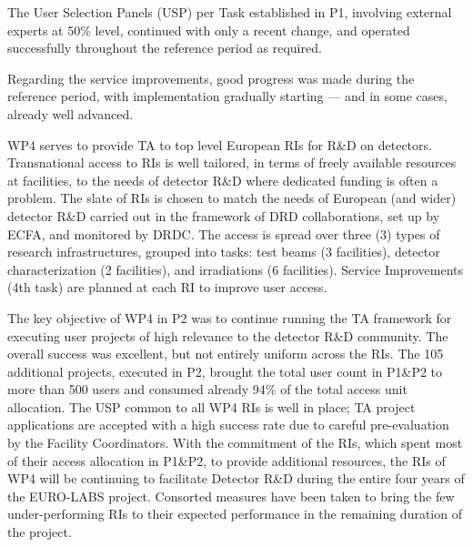 The User Selection Panels (USP) per Task established in P1, involving external experts at 50\% level,  continued with only a recent change, and operated successfully throughout the reference period as required. 

Regarding the service improvements, good progress was made during the reference period, with implementation gradually starting — and in some cases, already well advanced.



WP4 serves to provide TA to top level European RIs for R\&D on detectors. Transnational access to RIs is well tailored, in terms of freely available resources at facilities, to the needs of detector R\&D where dedicated funding is often a problem. The slate of RIs is chosen to match the needs of European (and wider) detector R\&D carried out in the framework of DRD collaborations, set up by ECFA, and monitored by DRDC. The access is spread over three (3) types of research infrastructures, grouped into tasks: test beams (3 facilities), detector characterization (2 facilities), and irradiations (6 facilities). Service Improvements (4th task) are planned at each RI to improve user access.

The key objective of WP4 in P2 was to continue running the TA framework for executing user projects of high relevance to the detector R\&D community. The overall success was excellent, but not entirely uniform across the RIs. The 105 additional projects, executed in P2, brought the total user count in P1\&P2 to more than 500 users and consumed already 94\% of the total access unit allocation. The USP common to all WP4 RIs is well in place; TA project applications are accepted with a high success rate due to careful pre-evaluation by the Facility Coordinators. With the commitment of the RIs, which spent most of their access allocation in P1\&P2, to provide additional resources, the RIs of WP4 will be continuing to facilitate Detector R\&D during the entire four years of the EURO-LABS project. Consorted measures have been taken to bring the few under-performing RIs to their expected performance in the remaining duration of the project.





